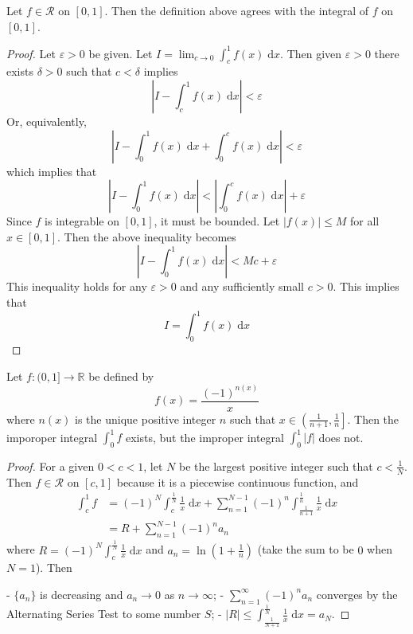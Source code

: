 \documentclass{homework}
\begin{document}
	\begin{alphaparts}
		\questionpart
		Let $f \in \mathscr{R}$ on $[0,1]$. Then the definition above agrees with the integral of $f$ on $[0,1]$.
		
		\begin{proof}
			Let $\varepsilon >0$ be given. Let $I = \lim_{c\to 0}\int_c^1f(x)\;\text{d}x$. Then given $\varepsilon > 0$ there exists $\delta >0$ such that $c < \delta$ implies
			$$
			\left|I - \int_c^1f(x)\;\text{d}x\right| < \varepsilon
			$$
			Or, equivalently,
			$$
			\left|I - \int_0^1f(x)\;\text{d}x + \int_0^c f(x)\;\text{d}x\right| < \varepsilon
			$$
			which implies that
			$$
			\left|I - \int_0^1 f(x)\;\text{d}x\right| <\left|\int_0^c f(x)\;\text{d}x\right| + \varepsilon
			$$
			Since $f$ is integrable on $[0,1]$, it must be bounded. Let $|f(x)| \le M$ for all $x \in [0,1]$. Then the above inequality becomes
			$$
			\left|I - \int_0^1 f(x)\;\text{d}x\right| < Mc + \varepsilon
			$$
			This inequality holds for any $\varepsilon > 0$ and any sufficiently small $c>0$. This implies that
			$$
			I = \int_0^1f(x)\;\text{d}x
			$$
		\end{proof}
		
		\questionpart
		Let $f: (0,1] \to \mathbb{R}$ be defined by
		$$
		f(x) = \frac{(-1)^{n(x)}}{x}
		$$
		where $n(x)$ is the unique positive integer $n$ such that $x \in \left(\frac{1}{n + 1}, \frac{1}{n}\right]$. Then the imporoper integral $\int_0^1 f$ exists, but the improper integral $\int_0^1|f|$ does not.
		
		\begin{proof} 
			For a given $0 < c < 1$, let $N$ be the largest positive integer such that $c < \frac{1}{N}$. Then $f \in \mathscr{R}$ on $[c,1]$ because it is a piecewise continuous function, and
			$$
			\begin{aligned}
				\int_c^1 f &= (-1)^N\int_{c}^\frac{1}{N}\frac{1}{x}\;\text{d}x + \sum_{n=1}^{N-1}(-1)^n\int_\frac{1}{n+1}^\frac{1}{n}\frac{1}{x}\;\text{d}x\\ &= R + \sum_{n=1}^{N-1}(-1)^na_n
			\end{aligned}
			$$
			where $R = (-1)^N \int_c^\frac{1}{N}\frac{1}{x}\;\text{d}x$ and $a_n = \ln\left(1+\frac{1}{n}\right)$ (take the sum to be $0$ when $N = 1$). Then
			
			- $\{a_n\}$ is decreasing and $a_n \to 0$ as $n \to \infty$;
			- $\sum_{n=1}^\infty (-1)^n a_n$ converges by the Alternating Series Test to some number $S$;
			- $|R| \le \int_\frac{1}{N+1}^\frac{1}{N}\frac{1}{x}\;\text{d}x = a_N$.
			

\end{proof}
\end{alphaparts}
\end{document}
